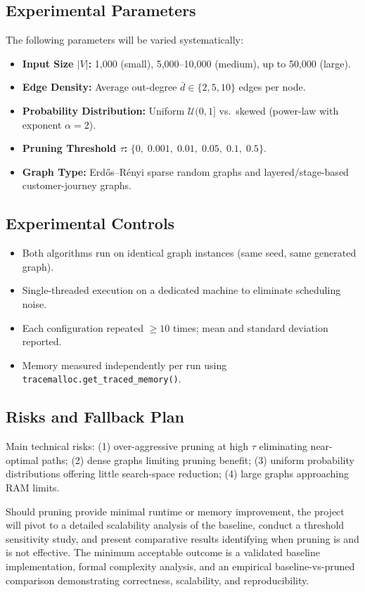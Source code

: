 \subsection{Experimental Parameters}

The following parameters will be varied systematically:
\begin{itemize}
    \item \textbf{Input Size $|V|$:} 1,000 (small), 5,000--10,000 (medium), up to 50,000 (large).
    \item \textbf{Edge Density:} Average out-degree $\bar{d} \in \{2, 5, 10\}$ edges per node.
    \item \textbf{Probability Distribution:} Uniform $\mathcal{U}(0,1]$ vs.\ skewed (power-law with exponent $\alpha = 2$).
    \item \textbf{Pruning Threshold $\tau$:} $\{0,\; 0.001,\; 0.01,\; 0.05,\; 0.1,\; 0.5\}$.

    \item \textbf{Graph Type:} Erd\H{o}s--R\'enyi sparse random graphs and layered/stage-based customer-journey graphs.
    
\end{itemize}



\subsection{Experimental Controls}

\begin{itemize}
    \item Both algorithms run on identical graph instances (same seed, same generated graph).
    \item Single-threaded execution on a dedicated machine to eliminate scheduling noise.
    \item Each configuration repeated $\geq 10$ times; mean and standard deviation reported.
    \item Memory measured independently per run using \texttt{tracemalloc.get\_traced\_memory()}.
\end{itemize}

\subsection{Risks and Fallback Plan}

Main technical risks: (1) over-aggressive pruning at high $\tau$ eliminating near-optimal paths; (2) dense graphs limiting pruning benefit; (3) uniform probability distributions offering little search-space reduction; (4) large graphs approaching RAM limits.

Should pruning provide minimal runtime or memory improvement, the project will pivot to a detailed scalability analysis of the baseline, conduct a threshold sensitivity study, and present comparative results identifying when pruning is and is not effective. The minimum acceptable outcome is a validated baseline implementation, formal complexity analysis, and an empirical baseline-vs-pruned comparison demonstrating correctness, scalability, and reproducibility.
